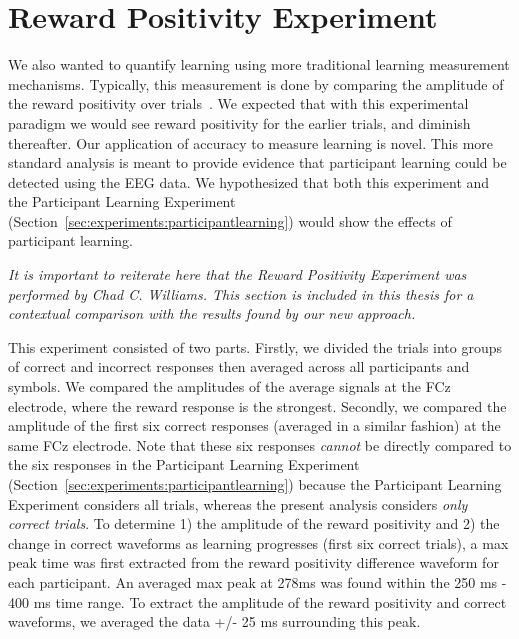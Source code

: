 \section{Reward Positivity Experiment}
\label{sec:experiments:rewpos}
We also wanted to quantify learning using more traditional learning measurement 
mechanisms. Typically, this measurement is done by comparing the amplitude of 
the reward positivity over trials~\cite{williams2017application}. We expected 
that with this experimental paradigm we would see reward positivity for the 
earlier trials, and diminish thereafter. Our application of \tvt accuracy to 
measure learning is novel.  This more standard analysis is meant to provide 
evidence that participant learning could be detected using the EEG data. We 
hypothesized that both this experiment and the Participant Learning Experiment 
(Section~\ref{sec:experiments:participantlearning}) would show the effects of 
participant learning.

\emph{It is important to reiterate here that the Reward Positivity Experiment 
was performed by Chad C. Williams. This section is included in this thesis for 
a contextual comparison with the results found by our new approach.}

This experiment consisted of two parts. Firstly, we divided the trials into 
groups of correct and incorrect responses then averaged across all participants 
and symbols. We compared the amplitudes of the average signals at the FCz 
electrode, where the reward response is the strongest. Secondly, we compared 
the amplitude of the first six correct responses (averaged in a similar 
fashion) at the same FCz electrode. Note that these six responses \emph{cannot} 
be directly compared to the six responses in the Participant Learning 
Experiment (Section~\ref{sec:experiments:participantlearning}) because the 
Participant Learning Experiment considers all trials, whereas the present 
analysis considers \emph{only correct trials}. To determine 1) the amplitude of 
the reward positivity and 2) the change in correct waveforms as learning 
progresses (first six correct trials), a max peak time was first extracted from 
the reward positivity difference waveform for each participant. An averaged max 
peak at 278ms was found within the 250 ms - 400 ms time range. To extract the 
amplitude of the reward positivity and correct waveforms, we  averaged the data 
+/- 25 ms surrounding this peak.
